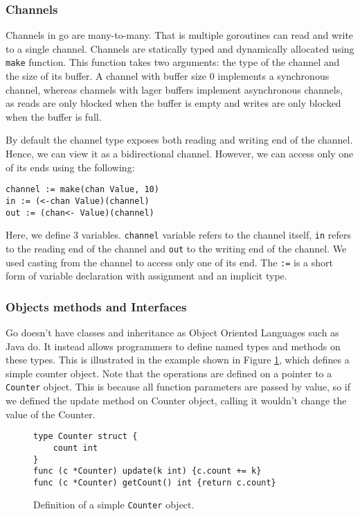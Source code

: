 \documentclass[12pt,a4paper]{article}
\begin{document}
\subsubsection{Channels}
Channels in go are many-to-many. That is multiple goroutines can
read and write to a single channel. Channels are statically typed and
dynamically allocated using \texttt{make} function. This function takes 
two arguments: the type of the channel and the size of its buffer.
A channel with buffer size 0 implements a synchronous channel, whereas 
channels with lager buffers implement asynchronous channels, as reads
are only blocked when the buffer is empty and writes are only blocked
when the buffer is full.

By default the channel type exposes both reading and writing end of the
channel. Hence, we can view it as a bidirectional channel. 
However, we can access only one of its ends using the following:
\begin{lstlisting}
channel := make(chan Value, 10)
in := (<-chan Value)(channel)
out := (chan<- Value)(channel)
\end{lstlisting}
Here, we define 3 variables. \texttt{channel} variable refers to the 
channel itself, \texttt{in} refers to the reading end of the channel
and \texttt{out} to the writing end of the channel. We used casting
from the channel to access only one of its end. The \texttt{:=} is a
short form of variable declaration with assignment and an implicit type.

\subsubsection{Objects methods and Interfaces}
Go doesn't have classes and inheritance as Object Oriented Languages 
such as Java do. It instead allows programmers to define named types
and methods on these types. This is illustrated in the example shown in 
Figure \ref{fig:counterObj}, which defines a simple counter object.
Note that the operations are defined on a pointer to a \texttt{Counter}
object. This is because all function parameters are passed by value, so
if we defined the update method on Counter object, calling it wouldn't
change the value of the Counter.

\begin{figure}[h]
\centering
\begin{lstlisting}
type Counter struct {
    count int
}
func (c *Counter) update(k int) {c.count += k}
func (c *Counter) getCount() int {return c.count}
\end{lstlisting}
\caption[scale=1.0]{Definition of a simple \texttt{Counter} object.}
\label{fig:counterObj}
\end{figure}
\end{document}
